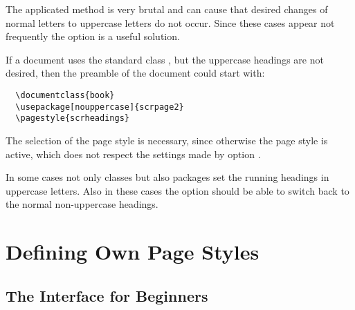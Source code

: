 The applicated method is very brutal and can cause that desired
changes of normal letters to uppercase letters
 do not occur.
Since these cases appear not frequently the option 
is a useful solution.

\begin{Example}
If a document uses the standard class ,
but the uppercase headings are not desired, then the preamble of
the document could start with:
\begin{lstlisting}
  \documentclass{book}
  \usepackage[nouppercase]{scrpage2}
  \pagestyle{scrheadings}
\end{lstlisting}
  The selection of the page style  is necessary,
  since otherwise the page style  is active, which
  does not respect the settings made by option .
\end{Example}

In some cases not only classes but also packages set the running
headings in uppercase letters.
Also in these cases the option  should be able
to switch back to the normal non-uppercase headings.

\section{Defining Own Page Styles}\label{sec:scrpage.UI}
%
% 
\subsection{The Interface for Beginners}\label{sec:scrpage.UI.user}
{}

